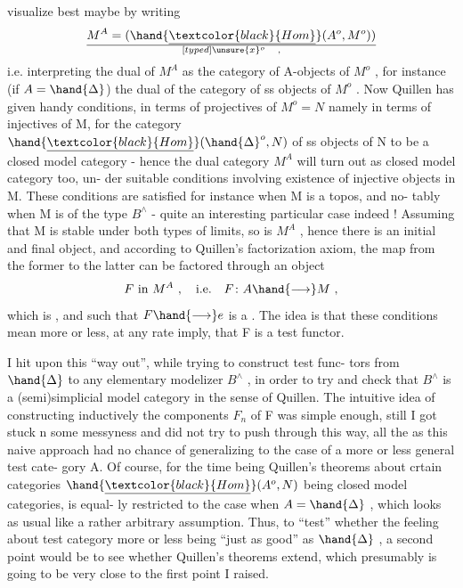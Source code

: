 
visualize best maybe by writing
\[ M^{A} = (\hand{\underline{\textcolor{black}{Hom}}}(A^{o},M^{o}))\over[typed]{\unsure{x}}{^{o}} \quad , \]
i.e. interpreting the dual of $M^{A}$ as the category of A-objects of $M^{o}$ ,
for instance (if $A = \hand{\Delta}$)  the  dual of the category of ss objects of
$M^{o}$ . Now Quillen has given handy conditions, in terms of projectives
of $M^{o} = N$ namely in terms of injectives of M, for the category
$\hand{\underline{\textcolor{black}{Hom}}}(\hand{\Delta}^{o},N)$ of ss objects of N to be a closed model category - hence
the dual category $M^{A}$ will turn out as  closed model category too, un-%
der suitable conditions involving existence of injective objects in M.
These conditions are satisfied for instance when M is a topos, and no-%
tably when M is of the type $B^{\wedge}$ - quite an interesting particular case
indeed ! Assuming that M is stable under both types of limits, so is
$M^{A}$ , hence there is an initial and final object, and according to
Quillen's factorization axiom, the  map from the former to
the latter can be factored through an object
\[ F \text{ in } M^{A} \ , \quad \text{i.e.} \quad F \colon A \hand{\longrightarrow} M \ , \]
which is \hand{\uline{\textcolor{black}{cofibering}}}, and such that $F \hand{\longrightarrow} e$ is a \hand{\uline{\textcolor{black}{trivial fibration}}}.
The idea is that these conditions mean more or less, at any rate imply,
that F is a test functor.

I hit upon this ``way out'', while trying to construct test func-%
tors from $\hand{\Delta}$ to any elementary modelizer $B^{\wedge}$ , in order to try and check
that $B^{\wedge}$ is a (semi)simplicial model category in the sense of Quillen.
The intuitive idea of constructing inductively the components $F_{n}$ of F
was simple enough, still I got stuck n some messyness and did not try
to push through this way, all the  as this naive approach had no
chance of generalizing to the case of a more or less general test cate-%
gory A. Of course, for the time being Quillen's theorems\hand{,} about
crtain categories $\hand{\underline{\textcolor{black}{Hom}}}(A^{o},N)$ being closed model categories, is equal-%
ly restricted to the case when $A = \hand{\Delta}$ , which looks as usual like a
rather arbitrary assumption. Thus, to ``test'' whether the feeling 
about \hand{\uline{\textcolor{black}{any}}} test category more or less being ``just as good'' as $\hand{\Delta}$ , a
second point would be to see whether Quillen's theorems extend, which
presumably is going to be very close to the first point I raised.

